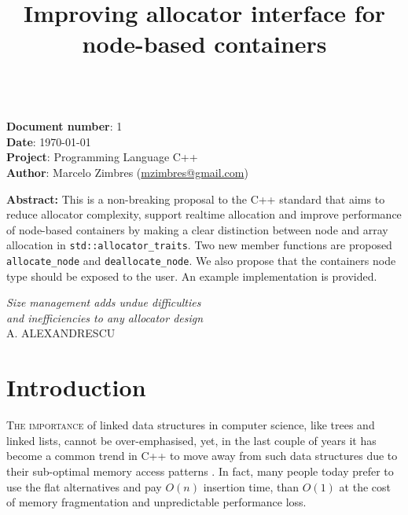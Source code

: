 \documentclass[11pt]{article}
\begin{document}
\date{}
\title{\vspace{-2cm} \bf Improving allocator interface for node-based containers}
\maketitle
\noindent
\vspace{-1cm} \\
{\bf Document number}:  1 \\
{\bf Date}:  \today \\
{\bf Project}: Programming Language C++ \\
{\bf Author}: Marcelo Zimbres (\href{mailto:mzimbres@gmail.com}{mzimbres@gmail.com}) 

\vspace{1cm}

\noindent
{\bf Abstract: }This is a non-breaking proposal to the C++ standard that aims
to reduce allocator complexity, support realtime allocation and improve
performance of node-based containers by making a clear distinction between node
and array allocation in \texttt{std::allocator\_traits}.  Two new member
functions are proposed \texttt{allocate\_node} and \texttt{deallocate\_node}.
We also propose that the containers node type should be exposed to the user.
An example implementation is provided.

\tableofcontents

\vfill
\begin{flushright}
\noindent
{\it Size management adds undue difficulties \\
     and inefficiencies to any allocator design} \\
A. ALEXANDRESCU \\
\medskip
{\it }
\end{flushright}
\medskip

\section{Introduction}
\textsc{The importance} of linked data structures in computer science, like
trees and linked lists, cannot be over-emphasised, yet, in the last couple of
years it has become a common trend in C++ to move away from such data
structures due to their sub-optimal memory access patterns \cite{middleditch,
chandler, meyers}.  In fact, many people today prefer to use the flat
alternatives and pay $O(n)$ insertion time, than $O(1)$ at the cost of memory
fragmentation and unpredictable performance loss.  
\end{document}
